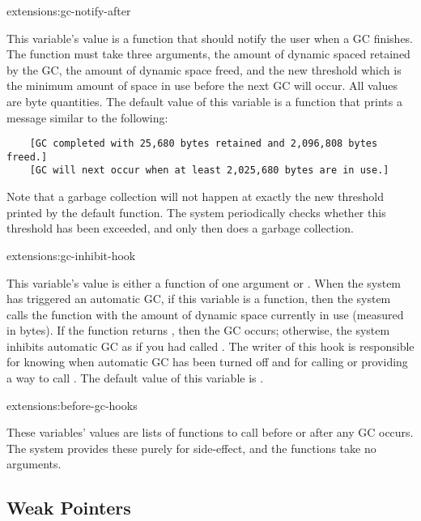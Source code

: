 \begin{defvar}{extensions:}{gc-notify-after}
  
  This variable's value is a function that should notify the user when
  a GC finishes.  The function must take three arguments, the amount
  of dynamic spaced retained by the GC, the amount of dynamic space
  freed, and the new threshold which is the minimum amount of space in
  use before the next GC will occur.  All values are byte quantities.
  The default value of this variable is a function that prints a
  message similar to the following:
  \begin{verbatim}
    [GC completed with 25,680 bytes retained and 2,096,808 bytes freed.]
    [GC will next occur when at least 2,025,680 bytes are in use.]
  \end{verbatim}
\end{defvar}

Note that a garbage collection will not happen at exactly the new
threshold printed by the default 
function.  The system periodically checks whether this threshold has
been exceeded, and only then does a garbage collection.

\begin{defvar}{extensions:}{gc-inhibit-hook}
  
  This variable's value is either a function of one argument or \nil.
  When the system has triggered an automatic GC, if this variable is a
  function, then the system calls the function with the amount of
  dynamic space currently in use (measured in bytes).  If the function
  returns \nil, then the GC occurs; otherwise, the system inhibits
  automatic GC as if you had called .  The writer of
  this hook is responsible for knowing when automatic GC has been
  turned off and for calling or providing a way to call
  .  The default value of this variable is \nil.
\end{defvar}

\begin{defvar}{extensions:}{before-gc-hooks}
  
  These variables' values are lists of functions to call before or
  after any GC occurs.  The system provides these purely for
  side-effect, and the functions take no arguments.
\end{defvar}


\subsection{Weak Pointers}

